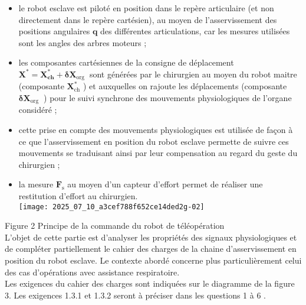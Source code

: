 \begin{itemize}
  \item le robot esclave est piloté en position dans le repère articulaire (et non directement dans le repère cartésien), au moyen de l'asservissement des positions angulaires $\mathbf{q}$ des différentes articulations, car les mesures utilisées sont les angles des arbres moteurs ;
  \item les composantes cartésiennes de la consigne de déplacement $\mathbf{X}^{*}=\mathbf{X}_{\mathbf{c h}}^{*}+\boldsymbol{\delta} \mathbf{X}_{\text {org }}$ sont générées par le chirurgien au moyen du robot maitre (composante $\mathbf{X}_{\mathrm{ch}}^{*}$ ) et auxquelles on rajoute les déplacements (composante $\boldsymbol{\delta} \mathbf{X}_{\text {org }}$ ) pour le suivi synchrone des mouvements physiologiques de l'organe considéré ;
  \item cette prise en compte des mouvements physiologiques est utilisée de façon à ce que l'asservissement en position du robot esclave permette de suivre ces mouvements se traduisant ainsi par leur compensation au regard du geste du chirurgien ;
  \item la mesure $\mathbf{F}_{\mathrm{s}}$ au moyen d'un capteur d'effort permet de réaliser une restitution d'effort au chirurgien.\\
\texttt{[image: 2025\_07\_10\_a3cef788f652ce14ded2g-02]}
\end{itemize}

Figure 2 Principe de la commande du robot de téléopération\\
L'objet de cette partie est d'analyser les propriétés des signaux physiologiques et de compléter partiellement le cahier des charges de la chaine d'asservissement en position du robot esclave. Le contexte abordé concerne plus particulièrement celui des cas d'opérations avec assistance respiratoire.\\
Les exigences du cahier des charges sont indiquées sur le diagramme de la figure 3. Les exigences 1.3.1 et 1.3.2 seront à préciser dans les questions 1 à 6 .

